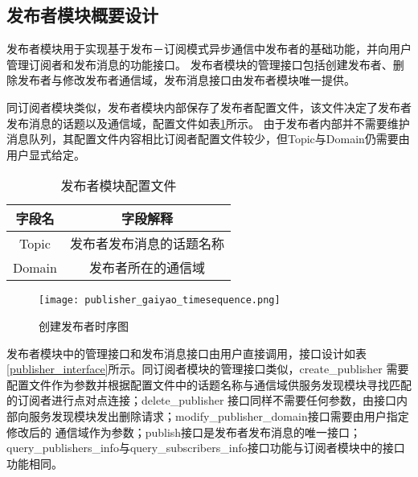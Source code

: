 
\subsection{发布者模块概要设计}
发布者模块用于实现基于发布－订阅模式异步通信中发布者的基础功能，并向用户管理订阅者和发布消息的功能接口。
发布者模块的管理接口包括创建发布者、删除发布者与修改发布者通信域，发布消息接口由发布者模块唯一提供。

同订阅者模块类似，发布者模块内部保存了发布者配置文件，该文件决定了发布者发布消息的话题以及通信域，配置文件如表\ref{publisher_config_file}所示。
由于发布者内部并不需要维护消息队列，其配置文件内容相比订阅者配置文件较少，但Topic与Domain仍需要由用户显式给定。
\begin{table}[htb]
  \centering\small
  \caption{发布者模块配置文件}
  \renewcommand\arraystretch{1.2}
  \label{publisher_config_file}
  \begin{tabular}{cc}
    \toprule
    字段名 & 字段解释 \\
    \midrule
    Topic & 发布者发布消息的话题名称\\
    Domain & 发布者所在的通信域\\
    \bottomrule
  \end{tabular}
\end{table}

\begin{figure}[H]
  \centering
  \texttt{[image: publisher\_gaiyao\_timesequence.png]}
  \caption{创建发布者时序图}
  \label{publisher_gaiyao_timesequence}
\end{figure}

发布者模块中的管理接口和发布消息接口由用户直接调用，接口设计如表\ref{publisher_interface}所示。同订阅者模块的管理接口类似，create\_publisher
需要配置文件作为参数并根据配置文件中的话题名称与通信域供服务发现模块寻找匹配的订阅者进行点对点连接；delete\_publisher
接口同样不需要任何参数，由接口内部向服务发现模块发出删除请求；modify\_publisher\_domain接口需要由用户指定修改后的
通信域作为参数；publish接口是发布者发布消息的唯一接口；query\_publishers\_info与query\_subscribers\_info接口功能与订阅者模块中的接口功能相同。

